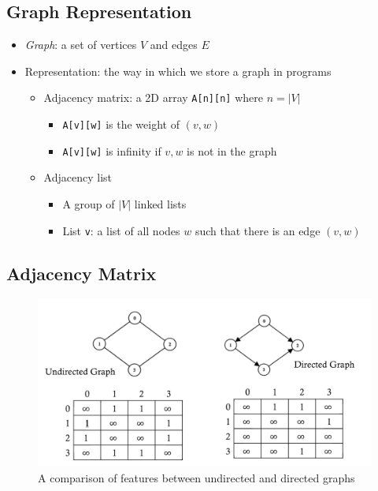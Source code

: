 \documentclass[
  10pt,
  english,
  letterpaper,
,tablecaptionabove
]{scrartcl}
\newcommand{\passthrough}[1]{#1}
\providecommand{\tightlist}{%
  \setlength{\itemsep}{0pt}\setlength{\parskip}{0pt}}
\begin{document}
\hypertarget{graph-representation}{%
\subsection{Graph Representation}\label{graph-representation}}

\begin{itemize}
\tightlist
\item
  \emph{Graph}: a set of vertices \(V\) and edges \(E\)
\item
  Representation: the way in which we store a graph in programs

  \begin{itemize}
  \tightlist
  \item
    Adjacency matrix: a 2D array \passthrough{\lstinline!A[n][n]!} where
    \(n = |V|\)

    \begin{itemize}
    \tightlist
    \item
      \passthrough{\lstinline!A[v][w]!} is the weight of \((v,w)\)
    \item
      \passthrough{\lstinline!A[v][w]!} is infinity if \(v,w\) is not in
      the graph
    \end{itemize}
  \item
    Adjacency list

    \begin{itemize}
    \tightlist
    \item
      A group of \(|V|\) linked lists
    \item
      List \passthrough{\lstinline!v!}: a list of all nodes \(w\) such
      that there is an edge \((v, w)\)
    \end{itemize}
  \end{itemize}
\end{itemize}

\hypertarget{adjacency-matrix}{%
\subsection{Adjacency Matrix}\label{adjacency-matrix}}

\begin{figure}
\centering
\includegraphics{images/1.png}
\caption{A comparison of features between undirected and directed
graphs}
\end{figure}
\end{document}
